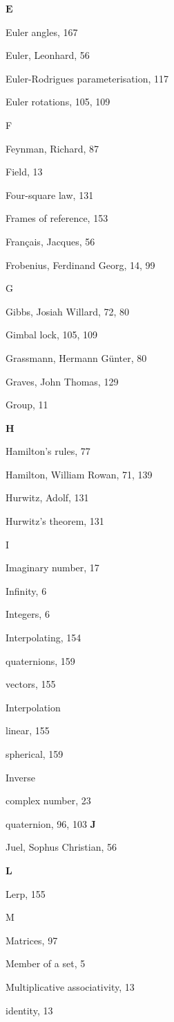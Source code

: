 \documentclass[10pt]{article}
\begin{document}
$\mathbf{E}$

Euler angles, 167

Euler, Leonhard, 56

Euler-Rodrigues parameterisation, 117

Euler rotations, 105, 109

F

Feynman, Richard, 87

Field, 13

Four-square law, 131

Frames of reference, 153

Français, Jacques, 56

Frobenius, Ferdinand Georg, 14, 99

G

Gibbs, Josiah Willard, 72, 80

Gimbal lock, 105, 109

Grassmann, Hermann Günter, 80

Graves, John Thomas, 129

Group, 11

$\mathbf{H}$

Hamilton's rules, 77

Hamilton, William Rowan, 71, 139

Hurwitz, Adolf, 131

Hurwitz's theorem, 131

I

Imaginary number, 17

Infinity, 6

Integers, 6

Interpolating, 154

quaternions, 159

vectors, 155

Interpolation

linear, 155

spherical, 159

Inverse

complex number, 23

quaternion, 96, 103 $\mathbf{J}$

Juel, Sophus Christian, 56

$\mathbf{L}$

Lerp, 155

M

Matrices, 97

Member of a set, 5

Multiplicative associativity, 13

identity, 13
\end{document}
